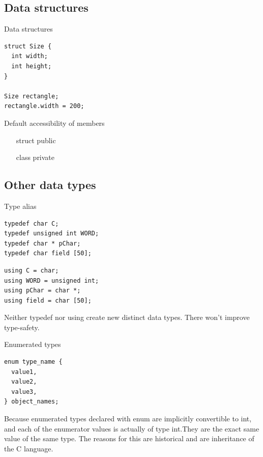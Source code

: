 \documentclass{beamer}
\begin{document}
\subsection{Data structures}
\begin{frame}[fragile]{Data structures}
\begin{lstlisting}
struct Size {
  int width;
  int height;
}

Size rectangle;
rectangle.width = 200;
\end{lstlisting}
\end{frame}

\begin{frame}{Default accessibility of members}
\begin{itemize}
  \item [struct] public
  \item [class] private
\end{itemize}
\end{frame}

\subsection{Other data types}
\begin{frame}[fragile]{Type alias}
\begin{lstlisting}[caption=type alias with typedef]
typedef char C;
typedef unsigned int WORD;
typedef char * pChar;
typedef char field [50];
\end{lstlisting}

\begin{lstlisting}[caption=type alias with using]
using C = char;
using WORD = unsigned int;
using pChar = char *;
using field = char [50];
\end{lstlisting}

Neither typedef nor using create new distinct data types. There won't improve
type-safety.
\end{frame}

\begin{frame}[fragile]{Enumerated types}
\begin{lstlisting}
enum type_name {
  value1,
  value2,
  value3,
} object_names;
\end{lstlisting}

Because enumerated types declared with enum are implicitly convertible to int,
and each of the enumerator values is actually of type int.They are the exact
same value of the same type. The reasons for this are historical and are
inheritance of the C language.
\end{frame}
\end{document}
